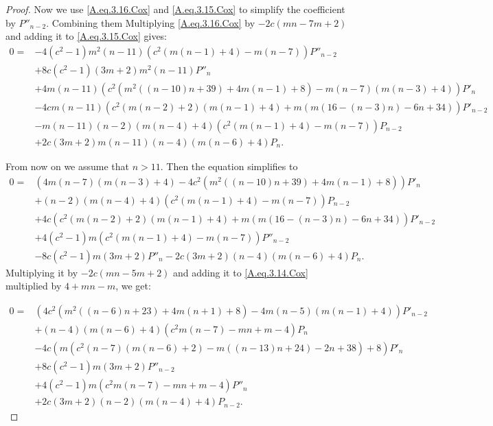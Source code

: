 \documentclass[review,nopreprintline]{elsarticle}
\theoremstyle{definition}
\numberwithin{equation}{section}
\theoremstyle{remark}
\begin{document}
\begin{proof}
	       Now we use  \eqref{A.eq.3.16.Cox} and \eqref{A.eq.3.15.Cox} to simplify the coefficient by $P''_{n-2}$. Combining them 
	        Multiplying \eqref{A.eq.3.16.Cox} by $-2 c (mn-7m+2)$ and adding it to \eqref{A.eq.3.15.Cox} gives:
	        \begin{align*}
	            0=&-4 \left(c^2-1\right) m^2 (n-11) \left(c^2 (m (n-1)+4)-m (n-7)\right) P''_{n-2} \\
	            &+8 c \left(c^2-1\right) (3 m+2) m^2 (n-11) P''_n \\
	            &+4 m (n-11) \left(c^2 \left(m^2 ((n-10) n+39)+4 m (n-1)+8\right)-m (n-7) (m (n-3)+4)\right)  P'_n \\
	            &-4 c m (n-11) \left(c^2 (m (n-2)+2) (m (n-1)+4)+m (m (16-(n-3) n)-6 n+34)\right) P'_{n-2} \\
	            &-m (n-11) (n-2) (m (n-4)+4) \left(c^2 (m (n-1)+4)-m (n-7)\right) P_{n-2} \\
	            &+2 c (3 m+2) m (n-11) (n-4) (m (n-6)+4) P_n.
	        \end{align*}
	        
	      From now on we assume   
	        that $n> 11$. Then  the equation simplifies to
	        \begin{align}
	            0=&\left(4 m (n-7) (m (n-3)+4)-4 c^2 \left(m^2 ((n-10) n+39)+4 m (n-1)+8\right)\right)  P'_n \nonumber\\
	            &+(n-2) (m (n-4)+4) \left(c^2 (m (n-1)+4)-m (n-7)\right) P_{n-2} \nonumber\\
	            &+4 c \left(c^2 (m (n-2)+2) (m (n-1)+4)+m (m (16-(n-3) n)-6 n+34)\right) P'_{n-2} \nonumber\\
	            &+4 \left(c^2-1\right) m \left(c^2 (m (n-1)+4)-m (n-7)\right) P''_{n-2} \nonumber\\
	            &-8 c \left(c^2-1\right) m (3 m+2) P''_n -2 c (3 m+2) (n-4) (m (n-6)+4) P_n. \label{A.eq.3.17.Cox}
	        \end{align}
	   Multiplying it by $-2 c (m n-5m+2)$ and adding it to  \eqref{A.eq.3.14.Cox} multiplied by $4+mn-m $, we get:
	       
	        \begin{align}
	            0=&\left(4 c^2 \left(m^2 ((n-6) n+23)+4 m (n+1)+8\right)-4 m (n-5) (m (n-1)+4)\right) P'_{n-2} \nonumber\\
	            &+(n-4) (m (n-6)+4) \left(c^2 m (n-7)-m n+m-4\right) P_n \nonumber\\
	            &-4 c \left(m \left(c^2 (n-7) (m (n-6)+2)-m ((n-13) n+24)-2 n+38\right)+8\right)  P'_n \nonumber\\
	            &+8 c \left(c^2-1\right) m (3 m+2) P''_{n-2} \nonumber\\
	            &+4 \left(c^2-1\right) m \left(c^2 m (n-7)-m n+m-4\right) P''_n \nonumber\\
	            &+2 c (3 m+2) (n-2) (m (n-4)+4) P_{n-2}. \label{A.eq.3.18.Cox}
	        \end{align}
	        

\end{proof}
\end{document}
